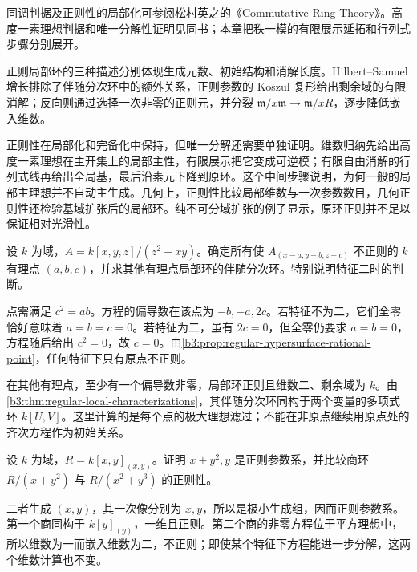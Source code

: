 \ProseParagraphBreak
同调判据及正则性的局部化可参阅松村英之的《Commutative Ring Theory》\cite[Theorems 19.2--19.3, pp. 156--157]{Matsumura1989CommutativeRingTheory}。高度一素理想判据和唯一分解性证明见同书\cite[Theorems 20.1--20.3, pp. 161--164]{Matsumura1989CommutativeRingTheory}；本章把秩一模的有限展示延拓和行列式步骤分别展开。







\begin{chaptersummary}
	正则局部环的三种描述分别体现生成元数、初始结构和消解长度。Hilbert–Samuel 增长排除了伴随分次环中的额外关系，正则参数的 Koszul 复形给出剩余域的有限消解；反向则通过选择一次非零的正则元，并分裂 \(\mathfrak m/x\mathfrak m\to\mathfrak m/xR\)，逐步降低嵌入维数。

	\ProseParagraphBreak
	正则性在局部化和完备化中保持，但唯一分解还需要单独证明。维数归纳先给出高度一素理想在主开集上的局部主性，有限展示把它变成可逆模；有限自由消解的行列式线再给出全局基，最后沿素元下降到原环。这个中间步骤说明，为何一般的局部主理想并不自动主生成。几何上，正则性比较局部维数与一次参数数目，几何正则性还检验基域扩张后的局部环。纯不可分域扩张的例子显示，原环正则并不足以保证相对光滑性。
\end{chaptersummary}

\BookExercises

\begin{exercise}\label{b3:ex:18-graph-and-cone}
	设 \(k\) 为域，\(A=k[x,y,z]/(z^2-xy)\)。确定所有使 \(A_{(x-a,y-b,z-c)}\) 不正则的 \(k\) 有理点 \((a,b,c)\)，并求其他有理点局部环的伴随分次环。特别说明特征二时的判断。
\end{exercise}
\begin{solution}
	点需满足 \(c^2=ab\)。方程的偏导数在该点为 \(-b,-a,2c\)。若特征不为二，它们全零恰好意味着 \(a=b=c=0\)。若特征为二，虽有 \(2c=0\)，但全零仍要求 \(a=b=0\)，方程随后给出 \(c^2=0\)，故 \(c=0\)。由\cref{b3:prop:regular-hypersurface-rational-point}，任何特征下只有原点不正则。

	在其他有理点，至少有一个偏导数非零，局部环正则且维数二、剩余域为 \(k\)。由\cref{b3:thm:regular-local-characterizations}，其伴随分次环同构于两个变量的多项式环 \(k[U,V]\)。这里计算的是每个点的极大理想滤过；不能在非原点继续用原点处的齐次方程作为初始关系。
\end{solution}

\begin{exercise}\label{b3:ex:18-linear-parameter-change}
	设 \(k\) 为域，\(R=k[x,y]_{(x,y)}\)。证明 \(x+y^2,y\) 是正则参数系，并比较商环 \(R/(x+y^2)\) 与 \(R/(x^2+y^3)\) 的正则性。
\end{exercise}
\begin{solution}
	二者生成 \((x,y)\)，其一次像分别为 \(x,y\)，所以是极小生成组，因而正则参数系。第一个商同构于 \(k[y]_{(y)}\)，一维且正则。第二个商的非零方程位于平方理想中，所以维数为一而嵌入维数为二，不正则；即使某个特征下方程能进一步分解，这两个维数计算也不变。
\end{solution}

